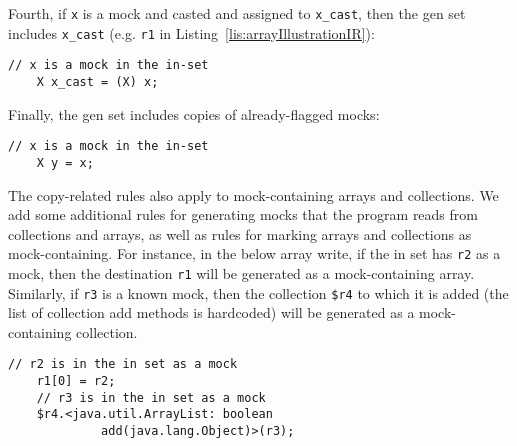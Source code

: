 Fourth, if \texttt{x} is a mock and casted and assigned to \texttt{x\_cast}, then the gen set includes \texttt{x\_cast} (e.g. \texttt{r1} in Listing~\ref{lis:arrayIllustrationIR}):
\begin{lstlisting}[basicstyle=\ttfamily\small,numbers=none]
    // x is a mock in the in-set
    X x_cast = (X) x;
\end{lstlisting}

Finally, the gen set includes copies of already-flagged mocks:
\begin{lstlisting}[basicstyle=\ttfamily\small,numbers=none]
    // x is a mock in the in-set
    X y = x;
\end{lstlisting}
The copy-related rules also apply to mock-containing arrays and collections. We add some additional rules for generating mocks that the program reads from collections and arrays, as well as rules for marking arrays and collections as mock-containing. For instance, in the below array write, if the in set has \texttt{r2} as a mock, then the destination \texttt{r1} will be generated as a mock-containing array. Similarly, if \texttt{r3} is a known mock, then the collection \texttt{\$r4} to which it is added (the list of collection add methods is hardcoded) will be generated as a mock-containing collection.
\begin{lstlisting}[basicstyle=\ttfamily\small,numbers=none]
    // r2 is in the in set as a mock
    r1[0] = r2;
    // r3 is in the in set as a mock
    $r4.<java.util.ArrayList: boolean
             add(java.lang.Object)>(r3);
\end{lstlisting}





